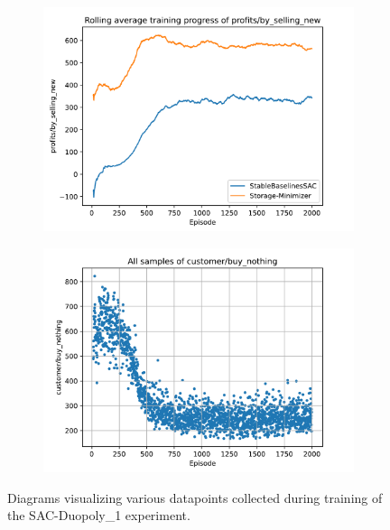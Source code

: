 \begin{figure}[!hbt]
	\begin{subfigure}{0.49\textwidth}
		\centering
		\includegraphics[width = \textwidth]{images/experiments/SACDuopoly/SACDuopolyMixedGraphs3.pdf}\\
		\label{fig:SACDuopolyMixedGraphs3}
	\end{subfigure}
	\begin{subfigure}{0.49\textwidth}
		\centering
		\includegraphics[width = \textwidth]{images/experiments/SACDuopoly/SACDuopolyMixedGraphs4.pdf}\\
		\label{fig:SACDuopolyMixedGraphs4}
	\end{subfigure}
	\caption{Diagrams visualizing various datapoints collected during training of the SAC-Duopoly\_1 experiment.}\label{fig:SACDuopolyMixedGraphs}
\end{figure}

